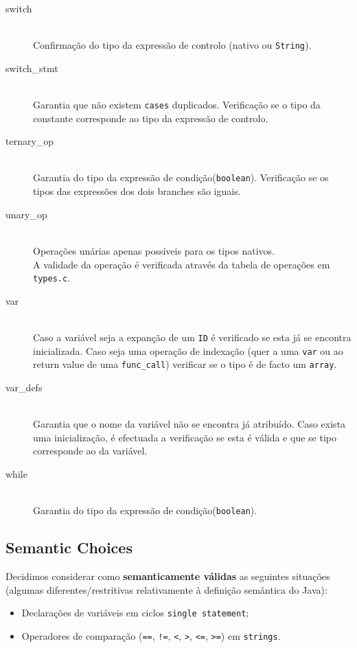 \documentclass[a4paper]{article}
\begin{document}
\begin{description}
	\item [switch] \hfill \\
		Confirmação do tipo da expressão de controlo (nativo ou \texttt{String}).
	
	\item [switch\_stmt] \hfill \\
		Garantia que não existem \texttt{cases} duplicados.
		Verificação se o tipo da constante corresponde ao tipo da expressão de controlo.

	\item [ternary\_op] \hfill \\
		Garantia do tipo da expressão de condição(\texttt{boolean}).
		Verificação se os tipos das expressões dos dois branches são iguais.

	\item [unary\_op] \hfill \\
		Operações unárias apenas possíveis para os tipos nativos. \\
		A validade da operação é verificada através da tabela de operações em \texttt{types.c}.

	\item [var] \hfill \\
		Caso a variável seja a expanção de um \texttt{ID} é verificado se esta já se encontra inicializada.
		Caso seja uma operação de indexação (quer a uma \texttt{var} ou ao return value de uma \texttt{func\_call}) verificar se o tipo é de facto um \texttt{array}. 
 
	\item [var\_defs] \hfill \\
		Garantia que o nome da variável não se encontra já atribuído.
		Caso exista uma inicialização, é efectuada a verificação se esta é válida e que se tipo corresponde ao da variável.

	\item [while] \hfill \\
		Garantia do tipo da expressão de condição(\texttt{boolean}).
\end{description}

\subsection{Semantic Choices}
\label{semantic_choices}
\indent \indent Decidimos considerar como \textbf{semanticamente válidas} as seguintes situações (algumas diferentes/restritivas relativamente à definição semântica do Java):
\begin{itemize}
	\item Declarações de variáveis em ciclos \texttt{single statement};
	\item Operadores de comparação (\texttt{==}, \texttt{!=}, \texttt{<}, \texttt{>}, \texttt{<=}, \texttt{>=}) em \texttt{strings}.
\end{itemize}
\end{document}
